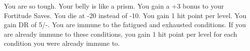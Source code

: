 \combatfeat
{You are so tough. Your belly is like a prism.}
{You gain a +3 bonus to your Fortitude Saves.}
{You die at -20 instead of -10.}
{You gain 1 hit point per level.}
{You gain DR of 5/-.}
{You are immune to the fatigued and exhausted conditions. If you are already immune to these conditions, you gain 1 hit point per level for each condition you were already immune to.}